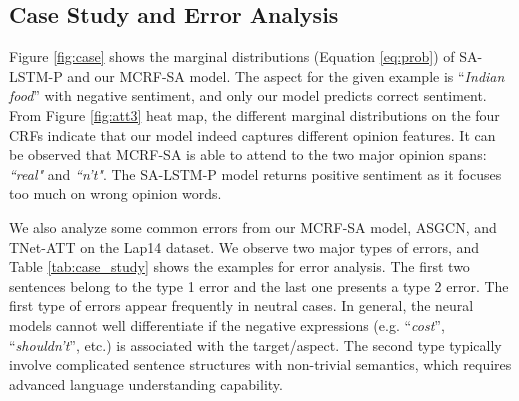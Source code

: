 \documentclass[11pt,a4paper]{article}
\begin{document}
\subsection{Case Study and Error Analysis}





Figure \ref{fig:case} shows the marginal distributions (Equation \ref{eq:prob}) of  SA-LSTM-P \cite{bailin-lu:2018:AAAI2018} and our MCRF-SA model. The aspect for the given example is ``\textit{Indian food}'' with negative sentiment, and only our model predicts correct sentiment. 
From Figure \ref{fig:att3} heat map, the different marginal distributions on the four CRFs indicate that our model indeed captures different opinion features. 
It can be observed that  MCRF-SA is able to attend to the two major opinion spans: \textit{``real"} and \textit{``n't"}. 
The SA-LSTM-P model returns positive sentiment as it focuses too much on wrong opinion words. 














We also analyze some common errors from our MCRF-SA model, ASGCN, and TNet-ATT on the Lap14 dataset. We observe two major types of errors, and Table \ref{tab:case_study} shows the examples for error analysis. The first two sentences belong to the type 1 error and the last one presents a type 2 error.
{\color{black}The first type of errors appear frequently in neutral cases. In general, the neural models cannot well differentiate if the negative expressions (e.g. ``{\em cost}'', ``{\em shouldn't}'', etc.) is associated with the target/aspect.} The second type typically involve complicated sentence structures with non-trivial semantics, which requires advanced language understanding capability. 
\end{document}
